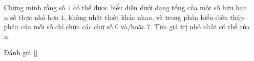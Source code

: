 \ifshowproblem
\begin{problem}\label{problem:ROU-2015-JBMO-TST-D5-P1}
    Chứng minh rằng số \(1\) có thể được biểu diễn dưới dạng tổng của một số hữu hạn \(n\) số thực nhỏ hơn \(1\), không nhất thiết khác nhau, 
    và trong phần biểu diễn thập phân của mỗi số chỉ chứa các chữ số \(0\) và/hoặc \(7\). 
    Tìm giá trị nhỏ nhất có thể của \(n\).
\end{problem}
\fi

\ifshowinfo
Đánh giá [\textbf{}]\footnotemark
{}
\fi
